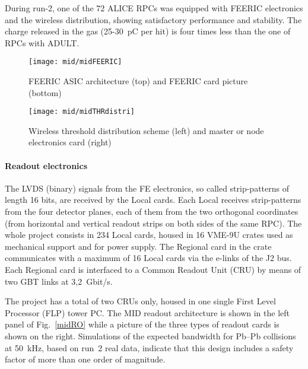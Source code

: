 During run-2, one of the 72 ALICE RPCs was equipped with FEERIC electronics and the wireless distribution, showing satisfactory performance and stability. The charge released in the gas (25-30~pC per hit) is four times less 
than the one of RPCs with ADULT.

\begin{figure}
\centering 
\texttt{[image: mid/midFEERIC]}
\caption{FEERIC ASIC architecture (top) and FEERIC card picture (bottom)}
\label{midFEERIC}
\end{figure}

\begin{figure}
\centering 
\texttt{[image: mid/midTHRdistri]}
\caption{Wireless threshold distribution scheme (left) and master or node electronics card (right)}
\label{midTHRdistri}
\end{figure}




\paragraph{Readout electronics\\}

The LVDS (binary) signals from the FE electronics, so called strip-patterns of length 16 bits, are received by the Local cards. 
Each Local receives strip-patterns from the four detector planes, each of them from the two orthogonal coordinates (from horizontal and vertical readout strips on both sides 
of the same RPC). The whole project consists in 234 Local cards, housed in 16 VME-9U crates used as mechanical support and for power supply. 
The Regional card in the crate communicates with a maximum of 16 Local cards via the e-links of the J2 bus. Each Regional card is interfaced to a Common Readout Unit (CRU) by means of two GBT links at 3,2~Gbit/s. 

The project has a total of two CRUs only, housed in one single First Level Processor (FLP) tower PC. The MID readout architecture is shown in the left panel of Fig.~\ref{midRO} while a picture of the three types of readout cards 
is shown on the right. Simulations of the expected bandwidth for Pb--Pb collisions at 50~kHz, based on run~2 real data, indicate that 
this design includes a safety factor of more than one order of magnitude. 

